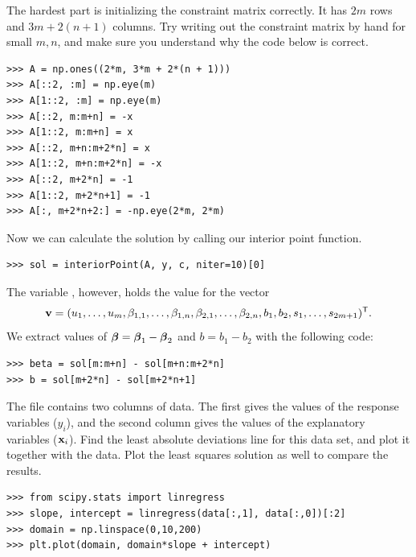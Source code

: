 The hardest part is initializing the constraint matrix correctly.
It has $2m$ rows and $3m + 2(n+1)$ columns.
Try writing out the constraint matrix by hand for small $m, n$, and make sure you understand why the code below is correct.
\begin{lstlisting}
>>> A = np.ones((2*m, 3*m + 2*(n + 1)))
>>> A[::2, :m] = np.eye(m)
>>> A[1::2, :m] = np.eye(m)
>>> A[::2, m:m+n] = -x
>>> A[1::2, m:m+n] = x
>>> A[::2, m+n:m+2*n] = x
>>> A[1::2, m+n:m+2*n] = -x
>>> A[::2, m+2*n] = -1
>>> A[1::2, m+2*n+1] = -1
>>> A[:, m+2*n+2:] = -np.eye(2*m, 2*m)
\end{lstlisting}

Now we can calculate the solution by calling our interior point function.
\begin{lstlisting}
>>> sol = interiorPoint(A, y, c, niter=10)[0]
\end{lstlisting}

The variable , however, holds the value for the vector
\[
\mathbf{v} = (u_1,\ldots, u_m, \beta_{1,1},\ldots, \beta_{1,n}, \beta_{2,1},\ldots, \beta_{2,n}, b_1, b_2, s_1,\ldots,s_{2m+1})^{\mathsf T} .
\]
We extract values of $\boldsymbol{\beta} = \boldsymbol{\beta}_1-\boldsymbol{\beta}_2$ and $b = b_1 - b_2$ with the following code:
\begin{lstlisting}
>>> beta = sol[m:m+n] - sol[m+n:m+2*n]
>>> b = sol[m+2*n] - sol[m+2*n+1]
\end{lstlisting}

\begin{problem} %
The file  contains two columns of data.
The first gives the values of the response variables ($y_i$), and the second column gives the values of the explanatory variables ($\mathbf{x}_i$).
Find the least absolute deviations line for this data set, and plot it together with the data.
Plot the least squares solution as well to compare the results.
\begin{lstlisting}
>>> from scipy.stats import linregress
>>> slope, intercept = linregress(data[:,1], data[:,0])[:2]
>>> domain = np.linspace(0,10,200)
>>> plt.plot(domain, domain*slope + intercept)
\end{lstlisting}
\end{problem}

